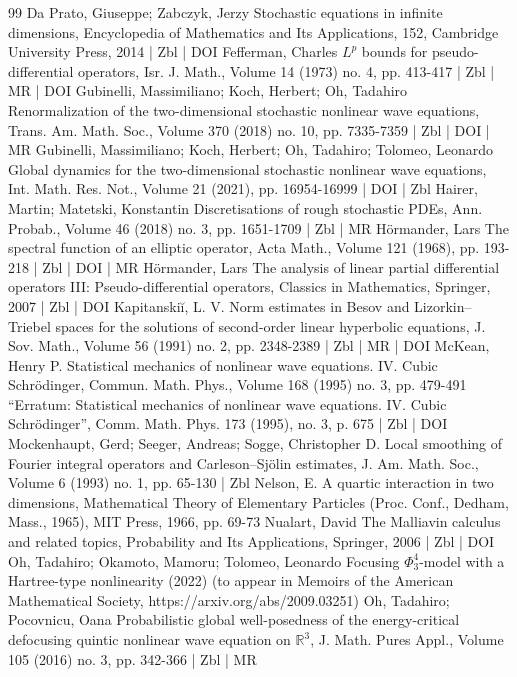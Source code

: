 \documentclass[10pt]{amsart}
\theoremstyle{definition}\newtheorem{defi}[theo]{Definition}\newtheorem{rema}[theo]{Remark}\newtheorem{exam}[theo]{Example}\newtheorem{exem}[theo]{Example}\newtheorem{nota}[theo]{Notation}
\begin{document}
\begin{thebibliography}{99}
 Da Prato, Giuseppe; Zabczyk, Jerzy Stochastic equations in infinite dimensions, Encyclopedia of Mathematics and Its Applications, 152, Cambridge University Press, 2014 | Zbl | DOI
 Fefferman, Charles ${L}^p$ bounds for pseudo-differential operators, Isr. J. Math., Volume 14 (1973) no. 4, pp. 413-417 | Zbl | MR | DOI
 Gubinelli, Massimiliano; Koch, Herbert; Oh, Tadahiro Renormalization of the two-dimensional stochastic nonlinear wave equations, Trans. Am. Math. Soc., Volume 370 (2018) no. 10, pp. 7335-7359 | Zbl | DOI | MR
 Gubinelli, Massimiliano; Koch, Herbert; Oh, Tadahiro; Tolomeo, Leonardo Global dynamics for the two-dimensional stochastic nonlinear wave equations, Int. Math. Res. Not., Volume 21 (2021), pp. 16954-16999 | DOI | Zbl
 Hairer, Martin; Matetski, Konstantin Discretisations of rough stochastic PDEs, Ann. Probab., Volume 46 (2018) no. 3, pp. 1651-1709 | Zbl | MR
 Hörmander, Lars The spectral function of an elliptic operator, Acta Math., Volume 121 (1968), pp. 193-218 | Zbl | DOI | MR
 Hörmander, Lars The analysis of linear partial differential operators III: Pseudo-differential operators, Classics in Mathematics, Springer, 2007 | Zbl | DOI
 Kapitanskiĭ, L. V. Norm estimates in Besov and Lizorkin–Triebel spaces for the solutions of second-order linear hyperbolic equations, J. Sov. Math., Volume 56 (1991) no. 2, pp. 2348-2389 | Zbl | MR | DOI
 McKean, Henry P. Statistical mechanics of nonlinear wave equations. IV. Cubic Schrödinger, Commun. Math. Phys., Volume 168 (1995) no. 3, pp. 479-491 “Erratum: Statistical mechanics of nonlinear wave equations. IV. Cubic Schrödinger”, Comm. Math. Phys. 173 (1995), no. 3, p. 675 | Zbl | DOI
 Mockenhaupt, Gerd; Seeger, Andreas; Sogge, Christopher D. Local smoothing of Fourier integral operators and Carleson–Sjölin estimates, J. Am. Math. Soc., Volume 6 (1993) no. 1, pp. 65-130 | Zbl
 Nelson, E. A quartic interaction in two dimensions, Mathematical Theory of Elementary Particles (Proc. Conf., Dedham, Mass., 1965), MIT Press, 1966, pp. 69-73
 Nualart, David The Malliavin calculus and related topics, Probability and Its Applications, Springer, 2006 | Zbl | DOI
 Oh, Tadahiro; Okamoto, Mamoru; Tolomeo, Leonardo Focusing $\Phi ^{4}_{3}$-model with a Hartree-type nonlinearity (2022) (to appear in Memoirs of the American Mathematical Society, https://arxiv.org/abs/2009.03251)
 Oh, Tadahiro; Pocovnicu, Oana Probabilistic global well-posedness of the energy-critical defocusing quintic nonlinear wave equation on $\mathbb{R}^3$, J. Math. Pures Appl., Volume 105 (2016) no. 3, pp. 342-366 | Zbl | MR

\end{thebibliography}
\end{document}
